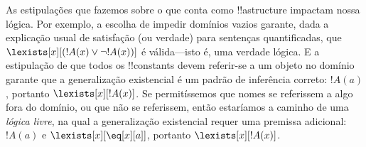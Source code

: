 \documentclass[../../../include/open-logic-section]{subfiles}
\begin{document}
\begin{digress}
As estipulações que fazemos sobre o que conta como !!a{structure} impactam
nossa lógica. Por exemplo, a escolha de impedir domínios vazios garante,
dada a explicação usual de satisfação (ou verdade) para sentenças
quantificadas, que $\lexists[x][(!A(x) \lor \lnot !A(x))]$ é
válida---isto é, uma verdade lógica. E a estipulação de que todos os
!!{constant}s devem referir-se a um objeto no domínio garante que a
generalização existencial é um padrão de inferência correto: $!A(a)$,
portanto $\lexists[x][!A(x)]$. Se permitíssemos que nomes se referissem a algo fora
do domínio, ou que não se referissem, então estaríamos a caminho de uma
\emph{lógica livre}, na qual a generalização existencial requer uma
premissa adicional: $!A(a)$ e $\lexists[x][\eq[x][a]]$, portanto
$\lexists[x][!A(x)]$.
\end{digress}
\end{document}
